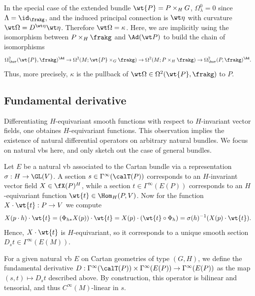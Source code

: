 \begin{rem}
    In the special case of the extended bundle $\wt{P}=P\times_H G$, $\Omega^0_\lambda=0$ since $\Lambda=\id_\frakg$, and the induced principal connection is $\wt\eta$ with curvature $\wt\Omega=D^{\wt\eta}\wt\eta$. Therefore $\wt\Omega=\kappa$. Here, we are implicitly using the isomorphism between $P\times_H\frakg$ and $\Ad(\wt P)$ to build the chain of isomorphisms
    \[\Omega^2_{\hor}(\wt{P},\frakg)^{\Ad}\to \Omega^2(M;\wt{P}\times_G \frakg)\to \Omega^2(M;P\times_H\frakg)\to \Omega^2_{\hor}(P,\frakg)^{\Ad}.\]
    Thus, more precisely, $\kappa$ is the pullback of $\wt\Omega\in\Omega^2(\wt{P},\frakg)$ to $P$.
\end{rem}



\subsection{Fundamental derivative}


Differentiating $H$-equivariant smooth functions with respect to $H$-invariant vector fields, one obtaines $H$-equivariant functions. This observation implies the existence of natural differential operators on arbitrary natural bundles. We focus on natural \glspl{vb} here, and only sketch out the case of general bundles.

Let $E$ be a natural \gls{vb} associated to the Cartan bundle via a representation $\sigma:H\to \GL(V)$. A section $s\in\Gamma^\infty(\calT(P))$ corresponds to an $H$-invariant vector field $X\in\fX(P)^H$, while a section $t\in\Gamma^\infty(E(P))$ corresponds to an $H$-equivariant function $\wt{t}\in\Hom_H(P,V)$. Now for the function $X\cdot \wt{t}:P\to V$ we compute 
\[X(p\cdot h)\cdot \wt{t}=(\Phi_{h\ast} X(p))\cdot \wt{t}=X(p)\cdot (\wt{t}\circ \Phi_h)=\sigma(h)^{-1}(X(p)\cdot \wt{t}).\]
Hence, $X\cdot\wt{t}$ is $H$-equivariant, so it corresponds to a unique smooth section $D_s t\in\Gamma^\infty(E(M))$.


\begin{defn}
    For a given natural \gls{vb} $E$ on Cartan geometries of type $(G,H)$, we define the fundamental derivative $D:\Gamma^\infty(\calT(P))\times\Gamma^\infty(E(P))\to \Gamma^\infty(E(P))$ as the map $(s,t)\mapsto D_s t$ described above.  By construction, this operator is bilinear and tensorial, and thus $C^\infty(M)$-linear in $s$.
\end{defn}











